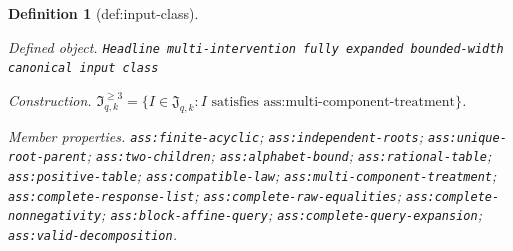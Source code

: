 \documentclass{article}
\newtheorem{definition}{Definition}
\begin{document}
\begin{definition}[def:input-class]\label{def:input-class}
\par\smallskip\noindent\emph{Defined object.} \texttt{Headline multi-\allowbreak{}intervention fully expanded bounded-\allowbreak{}width canonical input class}
\par\smallskip\noindent\emph{Construction.} \(\mathfrak I_{q,k}^{\ge3}=\{I\in\mathfrak J_{q,k}:I\text{ satisfies }\text{ass:multi-component-treatment}\}\).
\par\smallskip\noindent\emph{Member properties.} \texttt{ass:\allowbreak{}finite-\allowbreak{}acyclic}; \texttt{ass:\allowbreak{}independent-\allowbreak{}roots}; \texttt{ass:\allowbreak{}unique-\allowbreak{}root-\allowbreak{}parent}; \texttt{ass:\allowbreak{}two-\allowbreak{}children}; \texttt{ass:\allowbreak{}alphabet-\allowbreak{}bound}; \texttt{ass:\allowbreak{}rational-\allowbreak{}table}; \texttt{ass:\allowbreak{}positive-\allowbreak{}table}; \texttt{ass:\allowbreak{}compatible-\allowbreak{}law}; \texttt{ass:\allowbreak{}multi-\allowbreak{}component-\allowbreak{}treatment}; \texttt{ass:\allowbreak{}complete-\allowbreak{}response-\allowbreak{}list}; \texttt{ass:\allowbreak{}complete-\allowbreak{}raw-\allowbreak{}equalities}; \texttt{ass:\allowbreak{}complete-\allowbreak{}nonnegativity}; \texttt{ass:\allowbreak{}block-\allowbreak{}affine-\allowbreak{}query}; \texttt{ass:\allowbreak{}complete-\allowbreak{}query-\allowbreak{}expansion}; \texttt{ass:\allowbreak{}valid-\allowbreak{}decomposition}.
\end{definition}
\end{document}
